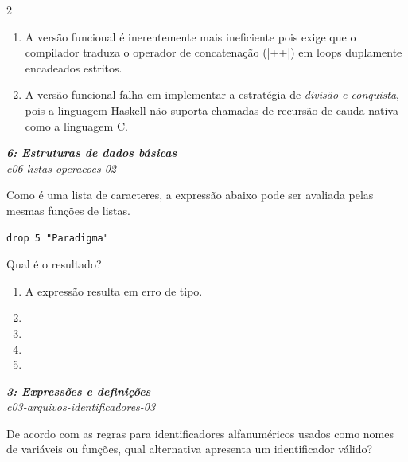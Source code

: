 \documentclass[a4paper,10pt,brazil]{article}
\begin{document}
\begin{multicols}{2}
\begin{enumerate}
  \item A versão funcional é inerentemente mais ineficiente pois exige que o compilador traduza o operador de concatenação (\haskellinline|++|) em loops duplamente encadeados estritos.

  \item A versão funcional falha em implementar a estratégia de \emph{divisão e conquista}, pois a linguagem Haskell não suporta chamadas de recursão de cauda nativa como a linguagem C.


\end{enumerate}

\begin{flushright}
  \footnotesize
  \textit{\textbf{6: Estruturas de dados básicas}}\\
  \textit{c06-listas-operacoes-02}\\

\end{flushright}
Como  é uma lista de caracteres, a expressão abaixo pode ser avaliada pelas mesmas funções de listas.
\begin{verbatim}
drop 5 "Paradigma"
\end{verbatim}
Qual é o resultado?

\begin{enumerate}
  \item A expressão resulta em erro de tipo.

  \item {}

  \item {}

  \item {}

  \item {}


\end{enumerate}

\begin{flushright}
  \footnotesize
  \textit{\textbf{3: Expressões e definições}}\\
  \textit{c03-arquivos-identificadores-03}\\

\end{flushright}
De acordo com as regras para identificadores alfanuméricos usados como nomes de variáveis ou funções, qual alternativa apresenta um identificador válido?


\end{multicols}
\end{document}
